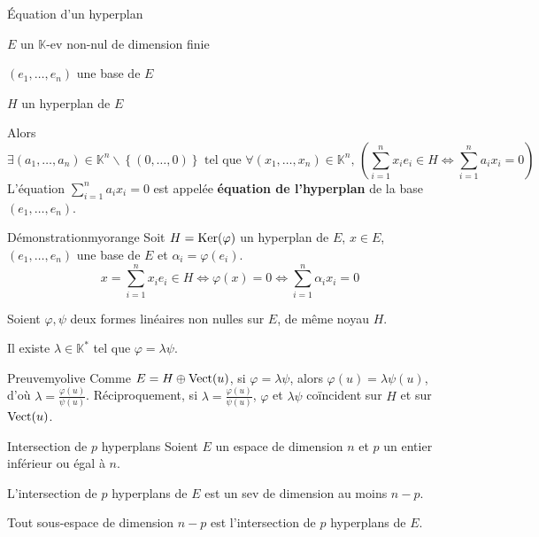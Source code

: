     \begin{coro}{Équation d’un hyperplan}{}
        \begin{soient}
            \item $E$ un $\mathbb{K}$-ev non-nul de dimension finie
            \item $(e_1, \ldots, e_n)$ une base de $E$
            \item $H$ un hyperplan de $E$
        \end{soient}
        Alors
        \[ \exists (a_1,\ldots,a_n) \in \mathbb{K}^n \backslash \left\{ (0, \ldots, 0) \right\} \text{ tel que } \forall (x_1,\ldots,x_n) \in \mathbb{K}^n, \, \left( \sum\limits_{i=1}^n x_i e_i \in H \iff \sum\limits_{i=1}^n a_i x_i = 0 \right) \]
        L’équation $ \sum\limits_{i=1}^n a_i x_i = 0$ est appelée \textbf{équation de l’hyperplan} de la base $(e_1,\ldots,e_n)$.
    \end{coro}
    
    \begin{demo}{Démonstration}{myorange}
        Soit $H = \operatorname{Ker}(\varphi)$ un hyperplan de $E$, $x \in E$, $(e_1,\ldots,e_n)$ une base de $E$ et $\alpha_i = \varphi(e_i)$.
        \[ x = \sum_{i=1}^{n} x_i e_i \in H \iff \varphi(x) = 0 \iff \sum_{i=1}^{n} \alpha_i x_i = 0 \]
    \end{demo}

    \begin{prop}{}{}
        Soient $\varphi, \psi$ deux formes linéaires non nulles sur $E$, de même noyau $H$. 

        Il existe $\lambda \in \mathbb{K}^*$ tel que $\varphi = \lambda \psi$.
    \end{prop}

    \begin{demo}{Preuve}{myolive}
        Comme $E = H \oplus \operatorname{Vect}(u)$, si $\varphi = \lambda \psi$, alors $\varphi(u) = \lambda \psi(u)$, d’où $\lambda = \frac{\varphi(u)}{\psi(u)}$. Réciproquement, si $\lambda = \frac{\varphi(u)}{\psi(u)}$, $\varphi$ et $\lambda \psi$ coïncident sur $H$ et sur $\operatorname{Vect}(u)$.
    \end{demo}

    \begin{prop}{Intersection de $p$ hyperplans}{}
        Soient $E$ un espace de dimension $n$ et $p$ un entier inférieur ou égal à $n$.
        \begin{alors}
            \item L’intersection de $p$ hyperplans de $E$ est un sev de dimension au moins $n-p$.
            \item Tout sous-espace de dimension $n-p$ est l’intersection de $p$ hyperplans de $E$.
        \end{alors}
    \end{prop}

